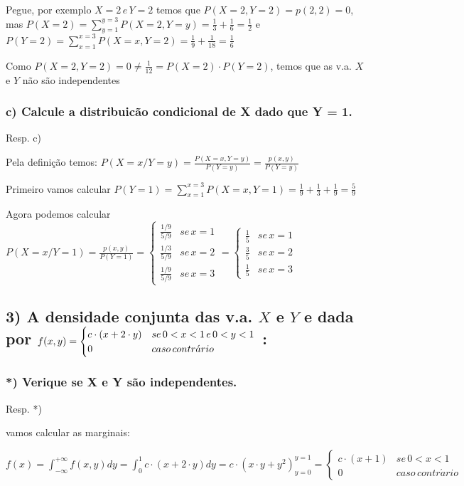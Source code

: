\documentclass[english]{article}
\begin{document}
Pegue, por exemplo $X=2\, e\, Y=2$ temos que $P(X=2,Y=2)=p(2,2)=0$,
mas $P(X=2)=\sum_{y=1}^{y=3}P(X=2,Y=y)=\frac{1}{3}+\frac{1}{6}=\frac{1}{2}$
e $P(Y=2)=\sum_{x=1}^{x=3}P(X=x,Y=2)=\frac{1}{9}+\frac{1}{18}=\frac{1}{6}$

Como $P(X=2,Y=2)=0\neq\frac{1}{12}=P(X=2)\cdot P(Y=2)$, temos que
as v.a. $X$ e $Y$ não são independentes


\subsubsection*{\textmd{c) Calcule a distribuicão condicional de X dado que Y = 1.}}

Resp. c)

Pela definição temos: $P(X=x/Y=y)=\frac{P(X=x,Y=y)}{P(Y=y)}=\frac{p(x,y)}{P(Y=y)}$

Primeiro vamos calcular $P(Y=1)=\sum_{x=1}^{x=3}P(X=x,Y=1)=\frac{1}{9}+\frac{1}{3}+\frac{1}{9}=\frac{5}{9}$

Agora podemos calcular $P(X=x/Y=1)=\frac{p(x,y)}{P(Y=1)}=\begin{cases}
\frac{1/9}{5/9} & se\, x=1\\
\frac{1/3}{5/9} & se\, x=2\\
\frac{1/9}{5/9} & se\, x=3
\end{cases}=\begin{cases}
\frac{1}{5} & se\, x=1\\
\frac{3}{5} & se\, x=2\\
\frac{1}{5} & se\, x=3
\end{cases}$


\subsection*{\textmd{3) A densidade conjunta das v.a. $X$ e $Y$ e dada por $f(x,y)=\protect\begin{cases}
c\cdot(x+2\cdot y) & se\,0<x<1\, e\,0<y<1\protect\\
0 & caso\, contr\acute{a}rio
\protect\end{cases}$ : }}


\subsubsection*{\textmd{{*}) Verique se X e Y são independentes. }}

Resp. {*})

vamos calcular as marginais:

$f(x)=\int_{-\infty}^{+\infty}f(x,y)dy=\int_{0}^{1}c\cdot(x+2\cdot y)dy=c\cdot(x\cdot y+y^{2})_{y=0}^{y=1}=\begin{cases}
c\cdot(x+1) & se\,0<x<1\\
0 & caso\, contr\acute{a}rio
\end{cases}$
\end{document}
